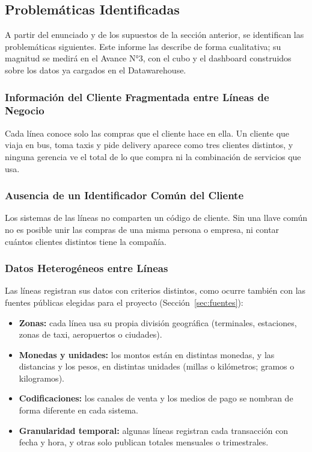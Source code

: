\subsection{Problemáticas Identificadas}
\label{sec:problematicas}

A partir del enunciado y de los supuestos de la sección anterior, se
identifican las problemáticas siguientes. Este informe las describe de forma
cualitativa; su magnitud se medirá en el Avance N°3, con el cubo y el
dashboard construidos sobre los datos ya cargados en el Datawarehouse.

\subsubsection{Información del Cliente Fragmentada entre Líneas de Negocio}

Cada línea conoce solo las compras que el cliente hace en ella. Un cliente que
viaja en bus, toma taxis y pide delivery aparece como tres clientes distintos,
y ninguna gerencia ve el total de lo que compra ni la combinación de servicios
que usa.

\subsubsection{Ausencia de un Identificador Común del Cliente}

Los sistemas de las líneas no comparten un código de cliente. Sin una llave
común no es posible unir las compras de una misma persona o empresa, ni contar
cuántos clientes distintos tiene la compañía.

\subsubsection{Datos Heterogéneos entre Líneas}

Las líneas registran sus datos con criterios distintos, como ocurre también
con las fuentes públicas elegidas para el proyecto (Sección~\ref{sec:fuentes}):

\begin{itemize}[leftmargin=*]
  \item \textbf{Zonas:} cada línea usa su propia división geográfica
        (terminales, estaciones, zonas de taxi, aeropuertos o ciudades).
  \item \textbf{Monedas y unidades:} los montos están en distintas monedas, y
        las distancias y los pesos, en distintas unidades (millas o
        kilómetros; gramos o kilogramos).
  \item \textbf{Codificaciones:} los canales de venta y los medios de pago se
        nombran de forma diferente en cada sistema.
  \item \textbf{Granularidad temporal:} algunas líneas registran cada
        transacción con fecha y hora, y otras solo publican totales mensuales
        o trimestrales.
\end{itemize}

